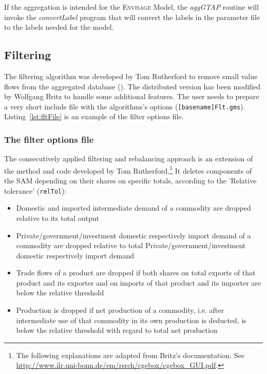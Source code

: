 If the aggregation is intended for the \textsc{Envisage} Model, the
\emph{aggGTAP} routine will invoke the \emph{convertLabel} program that will
convert the labels in the parameter file to the labels needed for the model.

\subsection{Filtering}

The filtering algorithm was developed by Tom Rutherford to remove small value
flows from the aggregated database (\cite{LanzRutherfordJGEA2016}). The
distributed version has been modified by Wolfgang Britz to handle some
additional features. The user needs to prepare a very short include file with
the algorithms's options (\texttt{[basename]Flt.gms}). Listing~\ref{lst:fltFile}
is an example of the filter options file.

\subsubsection{The filter options file}

The consecutively applied filtering and rebalancing approach is an extension of
the method and code developed by Tom
Rutherford.\footnote{The following explanations are adapted from Britz's
documentation. See
\url{http://www.ilr.uni-bonn.de/em/rsrch/cgebox/cgebox_GUI.pdf}.} It deletes
components of the SAM depending on their shares on specific totals, according to
the 'Relative tolerance' (\texttt{relTol}):

\begin{itemize}
   \item Domestic and imported intermediate demand of a commodity are dropped
         relative to its total output
   \item Private/government/investment domestic respectively import demand of a
         commodity are dropped relative to total Private/government/investment
         domestic respectively import demand
   \item Trade flows of a product are dropped if both shares on total exports of
         that product and its exporter and on imports of that product and its
         importer are below the relative threshold
   \item Production is dropped if net production of a commodity, i.e. after
         intermediate use of that commodity in its own production is deducted,
         is below the relative threshold with regard to total net production
\end{itemize}

